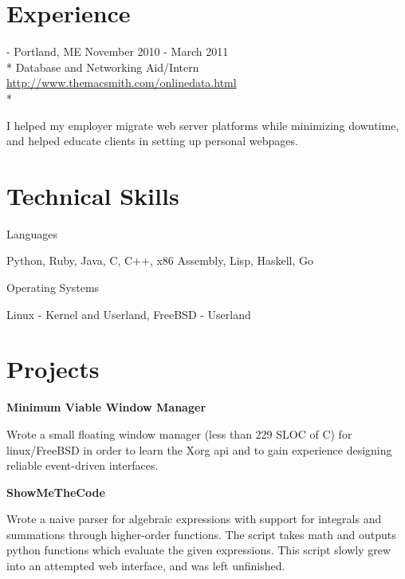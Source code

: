 \documentclass[letter,margin,line]{resume}
\newcommand{\rurl}[1]{\hfill {\footnotesize \url{#1}}}
\newcommand{\rdate}[1]{\hfill {\small #1}}
\renewcommand{\employer}[5]{\item[#1] - #2 \rdate{#3} \\* #4 \rurl{#5} \\*}
\begin{document}
\begin{resume}
\section{\mysidestyle Experience}
	\begin{asparadesc}
		\employer{MacSmith}{Portland, ME}{November 2010 - March 2011}{Database and Networking Aid/Intern}{http://www.themacsmith.com/onlinedata.html}
		\item\small I helped my employer migrate web server platforms while minimizing downtime, and helped educate clients in setting up personal webpages.
		\normalsize
		\\	
	\end{asparadesc}

\section{\mysidestyle Technical Skills}
	\begin{compactdesc}
		\item[Languages]
			\small\item Python, Ruby, Java, C, C++, x86 Assembly, Lisp, Haskell, Go
		\item[Operating Systems]
			\small\item Linux - Kernel and Userland, FreeBSD - Userland
	\end{compactdesc}
	
	
\section{\mysidestyle Projects}
	\begin{asparablank}
		\item {\bf Minimum Viable Window Manager}
		
		\small Wrote a small floating window manager (less than 229 SLOC of C) for linux/FreeBSD in order to learn the Xorg api and to gain experience designing reliable event-driven interfaces. 
		\normalsize
		\\
		
		\item {\bf ShowMeTheCode}
		
		\small Wrote a naive parser for algebraic expressions with support for integrals and summations through higher-order functions. The script takes math and outputs python functions which evaluate the given expressions. This script slowly grew into an attempted web interface, and was left unfinished.
		\normalsize		
		\\


\end{asparablank}
\end{resume}
\end{document}
